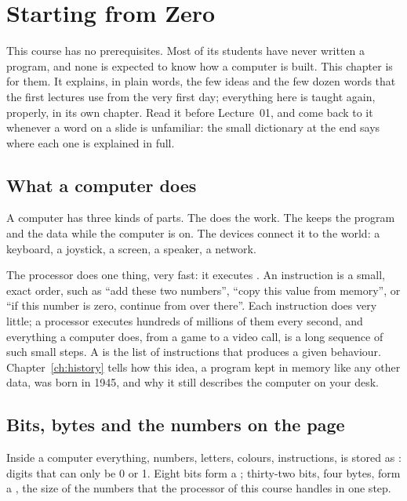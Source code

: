 \chapter{Starting from Zero}
\label{ch:zero}

This course has no prerequisites. Most of its students have never written a
program, and none is expected to know how a computer is built. This chapter is
for them. It explains, in plain words, the few ideas and the few dozen words
that the first lectures use from the very first day; everything here is taught
again, properly, in its own chapter. Read it before Lecture~01, and come back
to it whenever a word on a slide is unfamiliar: the small dictionary at the end
says where each one is explained in full.

\section*{What a computer does}

A computer has three kinds of parts. The  does the work. The
 keeps the program and the data while the computer is on. The
 devices connect it to the world: a keyboard, a
joystick, a screen, a speaker, a network.

The processor does one thing, very fast: it executes .
An instruction is a small, exact order, such as ``add these two numbers'',
``copy this value from memory'', or ``if this number is zero, continue from
over there''. Each instruction does very little; a processor executes hundreds
of millions of them every second, and everything a computer does, from a game
to a video call, is a long sequence of such small steps. A  is
the list of instructions that produces a given behaviour. Chapter~\ref{ch:history}
tells how this idea, a program kept in memory like any other data, was born in
1945, and why it still describes the computer on your desk.

\section*{Bits, bytes and the numbers on the page}

Inside a computer everything, numbers, letters, colours, instructions, is
stored as : digits that can only be 0 or 1. Eight bits form a
; thirty-two bits, four bytes, form a , the size of the
numbers that the processor of this course handles in one step.

